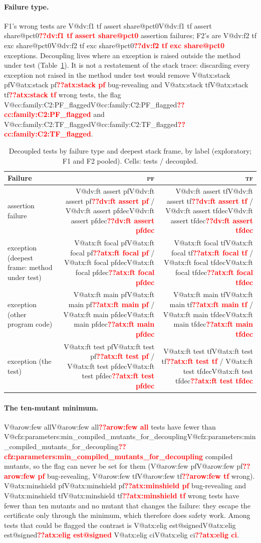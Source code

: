 \documentclass[pdflatex,iicol,sn-mathphys-num]{sn-jnl}
\makeatletter
\newcommand{\V}[1]{\ifcsname V@#1\endcsname\csname V@#1\endcsname\else\textbf{\textcolor{red}{??#1}}\fi}
\newcommand{\PF}{\textsc{pf}}
\newcommand{\TF}{\textsc{tf}}
\makeatother
\begin{document}
\paragraph{Failure type.} F1's wrong tests are \V{dv:f1 tf assert share@pct0} assertion failures; F2's are \V{dv:f2 tf exc share@pct0} exceptions. Decoupling lives where an exception is raised outside the method under test (Table~\ref{tab:failtype}). It is not a restatement of the stack trace: discarding every exception not raised in the method under test would remove \V{atx:stack pf} bug-revealing and \V{atx:stack tf} wrong tests, the flag \V{cc:family:C2:PF_flagged} and \V{cc:family:C2:TF_flagged}.

\begin{table}[t]
\caption{Decoupled tests by failure type and deepest stack frame, by label (exploratory; F1 and F2 pooled). Cells: tests / decoupled.}\label{tab:failtype}
\footnotesize
\begin{tabular}{@{}l r r@{}}
\toprule
Failure & \PF{} & \TF{} \\
\midrule
assertion failure & \V{dv:ft assert pf} / \V{dv:ft assert pfdec} & \V{dv:ft assert tf} / \V{dv:ft assert tfdec} \\
exception (deepest frame: method under test) & \V{atx:ft focal pf} / \V{atx:ft focal pfdec} & \V{atx:ft focal tf} / \V{atx:ft focal tfdec} \\
exception (other program code) & \V{atx:ft main pf} / \V{atx:ft main pfdec} & \V{atx:ft main tf} / \V{atx:ft main tfdec} \\
exception (the test) & \V{atx:ft test pf} / \V{atx:ft test pfdec} & \V{atx:ft test tf} / \V{atx:ft test tfdec} \\
\bottomrule
\end{tabular}
\end{table}

\paragraph{The ten-mutant minimum.} \V{arow:few all} tests have fewer than \V{cfz:parameters:min_compiled_mutants_for_decoupling} compiled mutants, so the flag can never be set for them (\V{arow:few pf} bug-revealing, \V{arow:few tf} wrong). \V{atx:minshield pf} bug-revealing and \V{atx:minshield tf} wrong tests have fewer than ten mutants and no mutant that changes the failure: they escape the certificate only through the minimum, which therefore does safety work. Among tests that could be flagged the contrast is \V{atx:elig est@signed} \V{atx:elig ci}.
\end{document}
